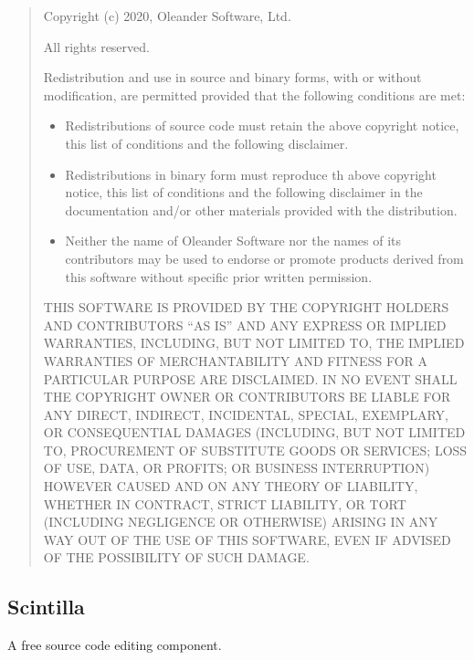 \documentclass[
]{book}
\theoremstyle{definition}
\theoremstyle{definition}
\theoremstyle{definition}
\theoremstyle{definition}
\theoremstyle{remark}
\begin{document}
\begin{quote}
Copyright (c) 2020, Oleander Software, Ltd.

All rights reserved.

Redistribution and use in source and binary forms, with
or without modification, are permitted provided that the
following conditions are met:

\begin{itemize}
\item
  Redistributions of source code must retain the above
  copyright notice, this list of conditions and the
  following disclaimer.
\item
  Redistributions in binary form must reproduce th
  above copyright notice, this list of conditions
  and the following disclaimer in the documentation
  and/or other materials provided with the distribution.
\item
  Neither the name of Oleander Software nor the names
  of its contributors may be used to endorse or promote
  products derived from this software without specific
  prior written permission.
\end{itemize}

THIS SOFTWARE IS PROVIDED BY THE COPYRIGHT HOLDERS AND
CONTRIBUTORS ``AS IS'' AND ANY EXPRESS OR IMPLIED WARRANTIES,
INCLUDING, BUT NOT LIMITED TO, THE IMPLIED WARRANTIES OF
MERCHANTABILITY AND FITNESS FOR A PARTICULAR PURPOSE ARE DISCLAIMED.
IN NO EVENT SHALL THE COPYRIGHT OWNER OR CONTRIBUTORS BE LIABLE
FOR ANY DIRECT, INDIRECT, INCIDENTAL, SPECIAL, EXEMPLARY, OR
CONSEQUENTIAL DAMAGES (INCLUDING, BUT NOT LIMITED TO, PROCUREMENT OF
SUBSTITUTE GOODS OR SERVICES; LOSS OF USE, DATA, OR PROFITS;
OR BUSINESS INTERRUPTION) HOWEVER CAUSED AND ON ANY THEORY OF LIABILITY,
WHETHER IN CONTRACT, STRICT LIABILITY, OR TORT
(INCLUDING NEGLIGENCE OR OTHERWISE) ARISING IN ANY WAY OUT OF THE
USE OF THIS SOFTWARE, EVEN IF ADVISED OF THE POSSIBILITY OF SUCH DAMAGE.
\end{quote}

\hypertarget{scintilla}{%
\subsection*{Scintilla}\label{scintilla}}

A free source code editing component.
\end{document}
